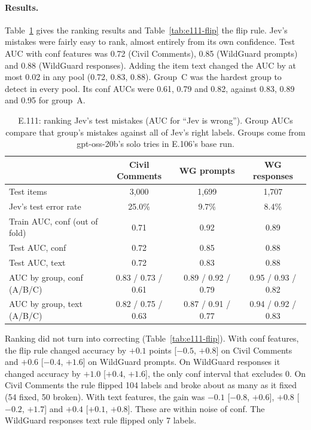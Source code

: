 \documentclass[11pt]{article}
\renewcommand{\_}{\origunderscore\allowbreak}
\begin{document}
\paragraph{Results.}
Table~\ref{tab:e111-auc} gives the ranking results and Table~\ref{tab:e111-flip} the flip rule. Jev's mistakes were fairly easy to rank, almost entirely from its own confidence. Test AUC with conf features was 0.72 (Civil Comments), 0.85 (WildGuard prompts) and 0.88 (WildGuard responses). Adding the item text changed the AUC by at most 0.02 in any pool (0.72, 0.83, 0.88). Group~C was the hardest group to detect in every pool. Its conf AUCs were 0.61, 0.79 and 0.82, against 0.83, 0.89 and 0.95 for group~A.

\begin{table}[H]
\centering
\small
\caption{E.111: ranking Jev's test mistakes (AUC for ``Jev is wrong''). Group AUCs compare that group's mistakes against all of Jev's right labels. Groups come from gpt-oss-20b's solo tries in E.106's base run.}
\label{tab:e111-auc}
\begin{tabular}{lccc}
\toprule
 & Civil Comments & WG prompts & WG responses \\
\midrule
Test items & 3{,}000 & 1{,}699 & 1{,}707 \\
Jev's test error rate & 25.0\% & 9.7\% & 8.4\% \\
Train AUC, conf (out of fold) & 0.71 & 0.92 & 0.89 \\
Test AUC, conf & 0.72 & 0.85 & 0.88 \\
Test AUC, text & 0.72 & 0.83 & 0.88 \\
AUC by group, conf (A/B/C) & 0.83 / 0.73 / 0.61 & 0.89 / 0.92 / 0.79 & 0.95 / 0.93 / 0.82 \\
AUC by group, text (A/B/C) & 0.82 / 0.75 / 0.63 & 0.87 / 0.91 / 0.77 & 0.94 / 0.92 / 0.83 \\
\bottomrule
\end{tabular}
\end{table}

Ranking did not turn into correcting (Table~\ref{tab:e111-flip}). With conf features, the flip rule changed accuracy by $+0.1$ points [$-0.5$, $+0.8$] on Civil Comments and $+0.6$ [$-0.4$, $+1.6$] on WildGuard prompts. On WildGuard responses it changed accuracy by $+1.0$ [$+0.4$, $+1.6$], the only conf interval that excludes 0. On Civil Comments the rule flipped 104 labels and broke about as many as it fixed (54 fixed, 50 broken). With text features, the gain was $-0.1$ [$-0.8$, $+0.6$], $+0.8$ [$-0.2$, $+1.7$] and $+0.4$ [$+0.1$, $+0.8$]. These are within noise of conf. The WildGuard responses text rule flipped only 7 labels.
\end{document}
